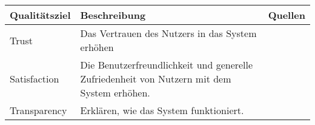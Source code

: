 \begin{table}[htb!]
    \begin{center}
        \begin{tabular}{|p{}|p{}|p{}|}
            \hline
            \textbf{Qualitätsziel}    & \textbf{Beschreibung} & \textbf{Quellen} \\ \hline
            Trust                       & Das Vertrauen des Nutzers in das System erhöhen \cite[vgl.][]{balog_measuring_2020}
                                        & \cite{nunes_systematic_2017} \cite{chazette_knowledge_nodate} \cite{tintarev_designing_nodate} \cite{balog_measuring_2020} \cite{eiband_impact_2019} \cite{tintarev2015explaining} \cite{hernandez-bocanegra_effects_2020} \cite{stange_effects_2021} \cite{weitz_you_2019} \cite{yamada_evaluating_2016} \cite{haspiel_explanations_2018} \cite{martin_developing_2019} \cite{martin_evaluating_2021} \cite{tsai_effects_2020}  \cite{sokol_one_2020}  \cite{wang_is_2018} \cite{koo_understanding_2016} \cite{wiegand2019drive} \cite{gunning2019darpa} \cite{lim_2009_assessing} \cite{tintarev2007survey} \cite{kunkel_let_2019} \\ \hline
            Satisfaction                & Die Benutzerfreundlichkeit und generelle Zufriedenheit von Nutzern mit dem System erhöhen. \cite[vgl.][]{balog_measuring_2020}
                                        & \cite{nunes_systematic_2017} \cite{chazette_knowledge_nodate} \cite{tintarev_designing_nodate} \cite{balog_measuring_2020} \cite{tsai_evaluating_2019} \cite{tintarev2015explaining} \cite{riveiro_thats_2021} \cite{martin_developing_2019} \cite{martin_evaluating_2021} \cite{tsai_effects_2020} \cite{ehsan_human-centered_2020} \cite{sovrano_modelling_2020} \cite{koo_understanding_2016} \cite{ribera2019can} \cite{gunning2019darpa} \cite{lim_2009_assessing}  \cite{tintarev2007survey} \cite{sato_context_nodate} \\ \hline
            Transparency                & Erklären, wie das System funktioniert. \cite[vgl.][]{balog_measuring_2020}
                                        & \cite{nunes_systematic_2017} \cite{chazette_knowledge_nodate} \cite{tintarev_designing_nodate} \cite{chazette_end-users_nodate} \cite{balog_measuring_2020} \cite{chazette2020explainability} \cite{tintarev2015explaining} \cite{hernandez-bocanegra_effects_2020} \cite{tsai_effects_2020} \cite{rjoob_towards_2021}  \cite{sokol_one_2020} \cite{wang_is_2018} \cite{koo_understanding_2016} \cite{tintarev2007survey}
                                        \cite{martin_evaluating_2021} \cite{ehsan_human-centered_2020}

\end{tabular}
\end{center}
\end{table}

